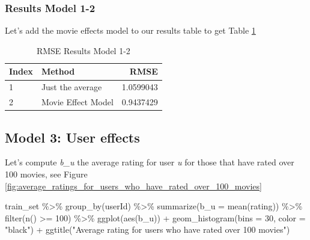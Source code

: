 \documentclass[
]{article}
\newenvironment{Shaded}{}{}
\newcommand{\AttributeTok}[1]{\textcolor[rgb]{0.49,0.56,0.16}{#1}}
\newcommand{\DecValTok}[1]{\textcolor[rgb]{0.25,0.63,0.44}{#1}}
\newcommand{\FunctionTok}[1]{\textcolor[rgb]{0.02,0.16,0.49}{#1}}
\newcommand{\NormalTok}[1]{#1}
\newcommand{\SpecialCharTok}[1]{\textcolor[rgb]{0.25,0.44,0.63}{#1}}
\newcommand{\StringTok}[1]{\textcolor[rgb]{0.25,0.44,0.63}{#1}}
\begin{document}
\newpage

\hypertarget{results-model-1-2}{%
\subsubsection{Results Model 1-2}\label{results-model-1-2}}

Let's add the movie effects model to our results table to get Table
\ref{tbl:rmse_results_model_1-2}

\begin{table}[H]

\caption{\label{tab:m_2_5}RMSE Results Model 1-2\label{tbl:rmse_results_model_1-2}}
\centering
\fontsize{7}{9}\selectfont
\begin{tabular}[t]{llr}
\toprule
Index & Method & RMSE\\
\midrule
1 & Just the average & 1.0599043\\
2 & Movie Effect Model & 0.9437429\\
\bottomrule
\end{tabular}
\end{table}

\newpage

\hypertarget{model-3-user-effects}{%
\subsection{Model 3: User effects}\label{model-3-user-effects}}

Let's compute \emph{b\_u} the average rating for user \emph{u} for those
that have rated over 100 movies, see Figure
\ref{fig:average_ratings_for_users_who_have_rated_over_100_movies}

\begin{Shaded}
\begin{Highlighting}[]
\NormalTok{train\_set }\SpecialCharTok{\%\textgreater{}\%} \FunctionTok{group\_by}\NormalTok{(userId) }\SpecialCharTok{\%\textgreater{}\%} \FunctionTok{summarize}\NormalTok{(}\AttributeTok{b\_u =} \FunctionTok{mean}\NormalTok{(rating)) }\SpecialCharTok{\%\textgreater{}\%} 
    \FunctionTok{filter}\NormalTok{(}\FunctionTok{n}\NormalTok{() }\SpecialCharTok{\textgreater{}=} \DecValTok{100}\NormalTok{) }\SpecialCharTok{\%\textgreater{}\%} \FunctionTok{ggplot}\NormalTok{(}\FunctionTok{aes}\NormalTok{(b\_u)) }\SpecialCharTok{+} \FunctionTok{geom\_histogram}\NormalTok{(}\AttributeTok{bins =} \DecValTok{30}\NormalTok{, }
    \AttributeTok{color =} \StringTok{"black"}\NormalTok{) }\SpecialCharTok{+} \FunctionTok{ggtitle}\NormalTok{(}\StringTok{"Average rating for users who have rated over 100 movies"}\NormalTok{)}
\end{Highlighting}
\end{Shaded}
\end{document}
